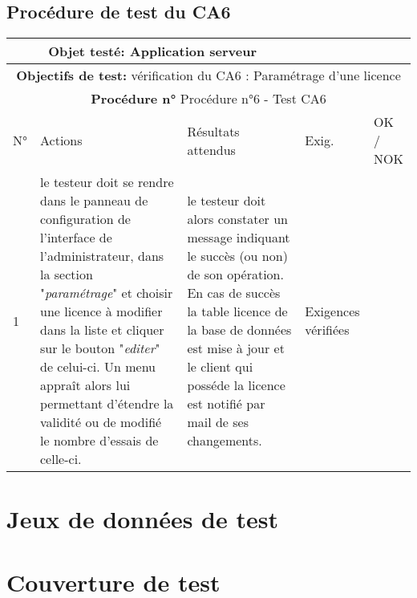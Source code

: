 \section{Procédure de test du CA6}
\begin{table}[!h]
        \centering
        \begin{tabular}{|m{0.6cm}|
                         >{\raggedright\arraybackslash}m{4cm}|
                         >{\raggedright\arraybackslash}m{6.4cm}|
                         >{\raggedright\arraybackslash}m{2cm}|
                         m{1cm}|}
            \hline
            \multicolumn{3}{|c|}{
                \textbf{Objet testé: } Application serveur
            } & \multicolumn{2}{|c|}{
                \textbf{Version: } version    
            } \\
            \hline
            \multicolumn{5}{|c|}{\textbf{Objectifs de test:} 
                vérification du CA6 : Paramétrage d'une licence} \\
            \hline
            \multicolumn{5}{|c|}{
                \textbf{Procédure n° }Procédure n°6 - Test CA6
            } \\
            \hline
            N° & Actions & Résultats attendus & Exig. & OK / NOK \\
            \hline      %
            1 & le testeur doit se rendre dans le panneau de configuration
                de l'interface de l'administrateur, dans la section 
                "\emph{paramétrage}" et choisir une licence à modifier
                dans la liste et cliquer sur le bouton "\emph{editer}" 
                de celui-ci. Un menu appraît alors lui permettant d'étendre
                la validité ou de modifié le nombre d'essais de celle-ci.
              & le testeur doit alors constater un message indiquant le 
                succès (ou non) de son opération. En cas de succès la 
                table licence de la base de données est mise à jour et
                le client qui posséde la licence est notifié par mail de 
                ses changements. 
              & Exigences vérifiées & \\
            \hline
        \end{tabular} 
        \label{tab:tab6}
\end{table}
\newpage

\chapter{Jeux de données de test}

\chapter{Couverture de test}

